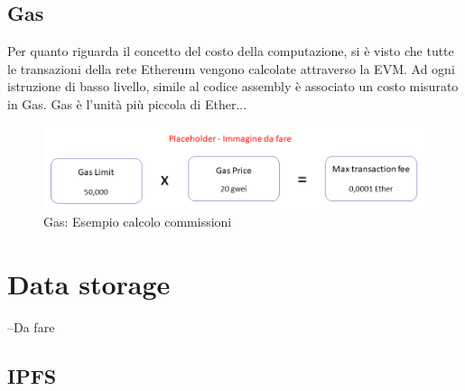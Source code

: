 \subsection{Gas}

Per quanto riguarda il concetto del costo della computazione, si è visto che tutte le transazioni della rete Ethereum vengono calcolate attraverso la EVM. Ad ogni istruzione di basso livello, simile al codice assembly è associato un costo misurato in Gas. Gas è l'unità più piccola di Ether...

\begin{figure}[H]
\centering
\includegraphics[width=1\textwidth]{immagini/gas.png}
\caption{Gas: Esempio calcolo commissioni}
\label{fig:GasEth}
\end{figure}
\section{Data storage}
--Da fare
\subsection{IPFS}